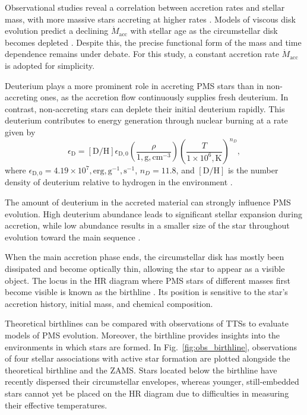 \documentclass[12pt,a4paper]{article}
\newcommand{\mr}{\mathrm}
\begin{document}
Observational studies reveal a correlation between accretion rates and stellar mass, with more massive stars accreting at higher rates \parencite[e.g.,][]{MuzerolleEtAl2003,ManaraEtAl2017,RugelEtAl2018,LanzafameEtAl2023}. Models of viscous disk evolution predict a declining $\dot{M}_\mr{acc}$ with stellar age as the circumstellar disk becomes depleted \parencite[e.g.,][]{HartmannEtAl1998,GortiHollenbach2009}.  Despite this, the precise functional form of the mass and time dependence remains under debate. For this study, a constant accretion rate $\dot{M}_\mr{acc}$ is adopted for simplicity.

Deuterium plays a more prominent role in accreting PMS stars than in non-accreting ones, as the accretion flow continuously supplies fresh deuterium. In contrast, non-accreting stars can deplete their initial deuterium rapidly. This deuterium contributes to energy generation through nuclear burning at a rate given by
\begin{equation}
  \epsilon_\mr{D} = \left[\mr{D/H}\right]\epsilon_\mr{D,0} \left(\frac{\rho}{1,\mr{g,cm^{-3}}}\right) \left(\frac{T}{1 \times 10^6,\mr{K}}\right)^{n_D}, \label{eq:deuterium_energy_prod_rate}
\end{equation}
where $\epsilon_\mr{D,0} = 4.19 \times 10^7,\mr{erg,g^{-1},s^{-1}}$, $n_D = 11.8$, and $\left[\mr{D/H}\right]$ is the number density of deuterium relative to hydrogen in the environment \parencite[cf. Eq.~11.27 in][]{StahlerPalla2004}.

The amount of deuterium in the accreted material can strongly influence PMS evolution. High deuterium abundance leads to significant stellar expansion during accretion, while low abundance results in a smaller size of the star throughout evolution toward the main sequence \parencite{KunitomoEtAl2017}.

When the main accretion phase ends, the circumstellar disk has mostly been dissipated and become optically thin, allowing the star to appear as a visible object. The locus in the HR diagram where PMS stars of different masses first become visible is known as the birthline \parencite{Stahler1983}. Its position is sensitive to the star's accretion history, initial mass, and chemical composition.

Theoretical birthlines can be compared with observations of TTSs to evaluate models of PMS evolution. Moreover, the birthline provides insights into the environments in which stars are formed. In Fig.~\ref{fig:obs_birthline}, observations of four stellar associations with active star formation are plotted alongside the theoretical birthline and the ZAMS. Stars located below the birthline have recently dispersed their circumstellar envelopes, whereas younger, still-embedded stars cannot yet be placed on the HR diagram due to difficulties in measuring their effective temperatures.
\end{document}
